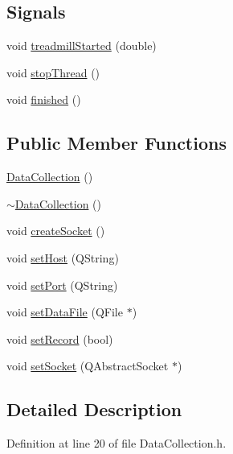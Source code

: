 \subsection*{Signals}
\begin{DoxyCompactItemize}
\item 
void \hyperlink{class_data_collection_ab4f3954209cf3fb115ae074bff3f6977}{treadmill\+Started} (double)
\item 
void \hyperlink{class_data_collection_a9240f5699ec71869a9dd8354e6d2eb9d}{stop\+Thread} ()
\item 
void \hyperlink{class_data_collection_a5473a04c2bb1b75d9798ac097cc4efef}{finished} ()
\end{DoxyCompactItemize}
\subsection*{Public Member Functions}
\begin{DoxyCompactItemize}
\item 
\hyperlink{class_data_collection_a9b9255ce56dbe9bb37184cd81b46f1f7}{Data\+Collection} ()
\item 
\hyperlink{class_data_collection_ab51334bac2a9cadc5d0c02142fa752a9}{$\sim$\+Data\+Collection} ()
\item 
void \hyperlink{class_data_collection_a5b6057761d039c35425e4d2096e88857}{create\+Socket} ()
\item 
void \hyperlink{class_data_collection_a9edfa021943d2cb01774ea5e2dfaa624}{set\+Host} (Q\+String)
\item 
void \hyperlink{class_data_collection_a6b3dc486f708a17e53df082dbe15c9eb}{set\+Port} (Q\+String)
\item 
void \hyperlink{class_data_collection_a72136206b4b1232a442e2ce89c62837a}{set\+Data\+File} (Q\+File $\ast$)
\item 
void \hyperlink{class_data_collection_a552bd8c19edeb3bed687a1ee8066ac4a}{set\+Record} (bool)
\item 
void \hyperlink{class_data_collection_a340ae86497b8b0f29d4911cf7dc8d0da}{set\+Socket} (Q\+Abstract\+Socket $\ast$)
\end{DoxyCompactItemize}


\subsection{Detailed Description}


Definition at line 20 of file Data\+Collection.\+h.



